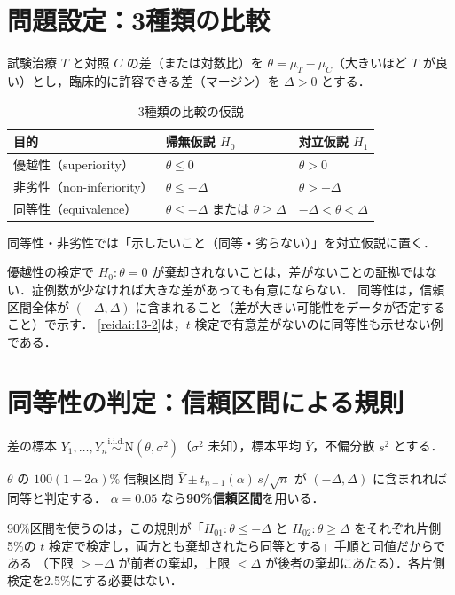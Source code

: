 \documentclass[a4paper,11pt,openany]{ltjsbook}
\newcommand{\tagbox}[2]{\tcbox[on line,boxsep=0.5pt,left=2pt,right=2pt,top=0.5pt,bottom=0.5pt,
  colframe=#1,colback=#1!10,boxrule=0.4pt,arc=1pt]{\scriptsize\bfseries\textcolor{#1}{#2}}}
\newcommand{\Hissu}{\tagbox{bkred}{必須}}
\newcommand{\iid}{\overset{\text{i.i.d.}}{\sim}}
\newcommand{\Normal}{\mathrm{N}}
\begin{document}
\section{問題設定：3種類の比較}\label{sec:13-setting}
試験治療 $T$ と対照 $C$ の差（または対数比）を $\theta=\mu_T-\mu_C$（大きいほど $T$ が良い）とし，臨床的に許容できる差（マージン）を $\Delta>0$ とする．
\begin{table}[htbp]
\centering\small
\caption{3種類の比較の仮説}\label{tab:13-hyp}
\begin{tabular}{@{}lll@{}}
\toprule
目的 & 帰無仮説 $H_0$ & 対立仮説 $H_1$\\
\midrule
優越性（superiority） & $\theta\le0$ & $\theta>0$\\
非劣性（non-inferiority） & $\theta\le-\Delta$ & $\theta>-\Delta$\\
同等性（equivalence） & $\theta\le-\Delta$ または $\theta\ge\Delta$ & $-\Delta<\theta<\Delta$\\
\bottomrule
\end{tabular}
\end{table}
同等性・非劣性では「示したいこと（同等・劣らない）」を対立仮説に置く．
\begin{warnbox}[「有意差なし」と「同等」]
優越性の検定で $H_0:\theta=0$ が棄却されないことは，差がないことの証拠ではない．症例数が少なければ大きな差があっても有意にならない．
同等性は，信頼区間全体が $(-\Delta,\Delta)$ に含まれること（差が大きい可能性をデータが否定すること）で示す．
\cref{reidai:13-2}は，$t$ 検定で有意差がないのに同等性も示せない例である．
\end{warnbox}

\section{同等性の判定：信頼区間による規則}\label{sec:13-equiv}
\Hissu
差の標本 $Y_1,\dots,Y_n\iid\Normal(\theta,\sigma^2)$（$\sigma^2$ 未知），標本平均 $\bar Y$，不偏分散 $s^2$ とする．
\begin{pointbox}[同等性の判定規則]
$\theta$ の $100(1-2\alpha)\%$ 信頼区間 $\bar Y\pm t_{n-1}(\alpha)\,s/\sqrt n$ が $(-\Delta,\Delta)$ に含まれれば同等と判定する．
$\alpha=0.05$ なら\textbf{90\%信頼区間}を用いる．
\end{pointbox}
90\%区間を使うのは，この規則が「$H_{01}:\theta\le-\Delta$ と $H_{02}:\theta\ge\Delta$ をそれぞれ片側5\%の $t$ 検定で検定し，両方とも棄却されたら同等とする」手順と同値だからである
（下限 $>-\Delta$ が前者の棄却，上限 $<\Delta$ が後者の棄却にあたる）．各片側検定を2.5\%にする必要はない．
\end{document}
